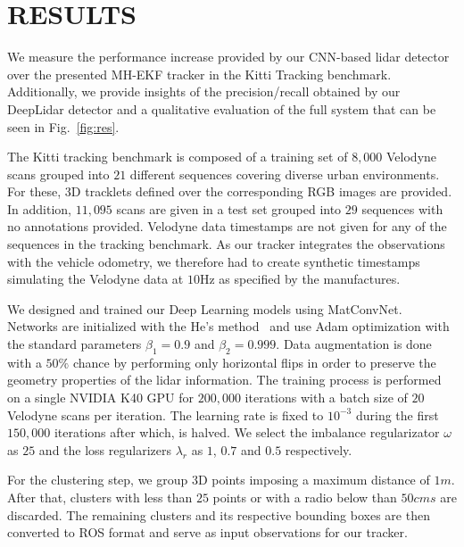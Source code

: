 \documentclass[letterpaper, 10 pt, conference]{ieeeconf}  %
\begin{document}
\pagebreak
\section{RESULTS}

We measure the performance increase provided by our CNN-based lidar detector over the presented MH-EKF tracker in the Kitti Tracking benchmark. 
Additionally, we provide insights of the precision/recall obtained by our DeepLidar detector and a qualitative evaluation of the full system that can be seen in Fig.~\ref{fig:res}.

The Kitti tracking benchmark is composed of a training set of $8,000$ Velodyne scans grouped into $21$ different sequences covering diverse urban environments. For these, 3D tracklets defined over the corresponding RGB images are provided. In addition, $11,095$ scans are given in a test set grouped into $29$ sequences with no annotations provided. 
Velodyne data timestamps are not given for any of the sequences in the tracking benchmark. As our tracker integrates the observations with the vehicle odometry, we therefore had to create synthetic timestamps simulating the Velodyne data at $10$Hz as specified by the manufactures. 

We designed and trained our Deep Learning models using MatConvNet. Networks are initialized with the He's method~\cite{he2015delving} and use Adam optimization with the standard parameters $\beta_1 = 0.9$ and $\beta_2 = 0.999$. 
Data augmentation is done with a $50\%$ chance by performing only horizontal flips in order to preserve the geometry properties of the lidar information.
The training process is performed on a single NVIDIA K40 GPU for $200,000$ iterations with a batch size of $20$ Velodyne scans per iteration. The learning rate is fixed to $10^{-3}$ during the first $150,000$ iterations after which, is halved. We select the imbalance regularizator $\omega$ as $25$ and the loss regularizers $\lambda_r$ as $1$, $0.7$ and $0.5$ respectively.

For the clustering step, we group 3D points imposing a maximum distance of $1m$. After that, clusters with less than $25$ points or with a radio below than $50cms$ are discarded. The remaining clusters and its respective bounding boxes are then converted to ROS format and serve as input observations for our tracker. 
\end{document}
